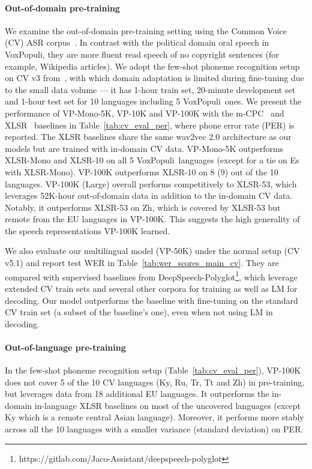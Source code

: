 \documentclass[11pt,a4paper]{article}
\newcommand{\vp}{VoxPopuli}
\begin{document}
\paragraph{Out-of-domain pre-training} We examine the out-of-domain pre-training setting using the Common Voice (CV) ASR corpus~\citep{ardila-etal-2020-common}. In contrast with the political domain oral speech in \vp, they are more fluent read speech of no copyright sentences (for example, Wikipedia articles). We adopt the few-shot phoneme recognition setup on CV v3 from~\citet{riviere2020unsupervised}, with which domain adaptation is limited during fine-tuning due to the small data volume --- it has 1-hour train set, 20-minute development set and 1-hour test set for 10 languages including 5 \vp~ones. We present the performance of VP-Mono-5K, VP-10K and VP-100K with the m-CPC~\citep{riviere2020unsupervised} and XLSR~\citep{conneau2020unsupervised} baselines in Table~\ref{tab:cv_eval_per}, where phone error rate (PER) is reported. The XLSR baselines share the same wav2vec 2.0 architecture as our models but are trained with in-domain CV data. VP-Mono-5K outperforms XLSR-Mono and XLSR-10 on all 5 \vp~languages (except for a tie on Es with XLSR-Mono). VP-100K outperforms XLSR-10 on 8 (9) out of the 10 languages. VP-100K (Large) overall performs competitively to XLSR-53, which leverages 52K-hour out-of-domain data in addition to the in-domain CV data. Notably, it outperforms XLSR-53 on Zh, which is covered by XLSR-53 but remote from the EU languages in VP-100K. This suggests the high generality of the speech representations VP-100K learned.

We also evaluate our multilingual model (VP-50K) under the normal setup (CV v5.1) and report test WER in Table~\ref{tab:wer_scores_main_cv}. 
They are compared with supervised baselines from  DeepSpeech-Polyglot\footnote{https://gitlab.com/Jaco-Assistant/deepspeech-polyglot}, which leverage extended CV train sets and several other corpora for training as well as LM for decoding. Our model outperforms the baseline with fine-tuning on the standard CV train set (a subset of the baseline's one), even when not using LM in decoding.

\paragraph{Out-of-language pre-training}
In the few-shot phoneme recognition setup (Table~\ref{tab:cv_eval_per}), VP-100K does not cover 5 of the 10 CV languages (Ky, Ru, Tr, Tt and Zh) in pre-training, but leverages data from 18 additional EU languages. It outperforms the in-domain in-language XLSR baselines on most of the uncovered languages (except Ky which is a remote central Asian language). Moreover, it performs more stably across all the 10 languages with a smaller variance (standard deviation) on PER.
\end{document}

